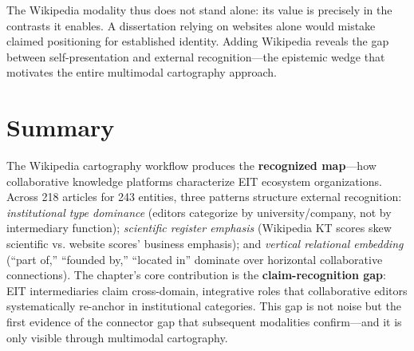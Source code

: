\documentclass[../main.tex]{subfiles}
\begin{document}
The Wikipedia modality thus does not stand alone: its value is precisely in the contrasts it enables. A dissertation relying on websites alone would mistake claimed positioning for established identity. Adding Wikipedia reveals the gap between self-presentation and external recognition---the epistemic wedge that motivates the entire multimodal cartography approach.


\section{Summary}

\begin{summarybox}
The Wikipedia cartography workflow produces the \textbf{recognized map}---how collaborative knowledge platforms characterize EIT ecosystem organizations. Across 218 articles for 243 entities, three patterns structure external recognition: \emph{institutional type dominance} (editors categorize by university/company, not by intermediary function); \emph{scientific register emphasis} (Wikipedia KT scores skew scientific vs. website scores' business emphasis); and \emph{vertical relational embedding} (``part of,'' ``founded by,'' ``located in'' dominate over horizontal collaborative connections). The chapter's core contribution is the \textbf{claim-recognition gap}: EIT intermediaries claim cross-domain, integrative roles that collaborative editors systematically re-anchor in institutional categories. This gap is not noise but the first evidence of the connector gap that subsequent modalities confirm---and it is only visible through multimodal cartography.
\end{summarybox}

\clearpage
\end{document}
